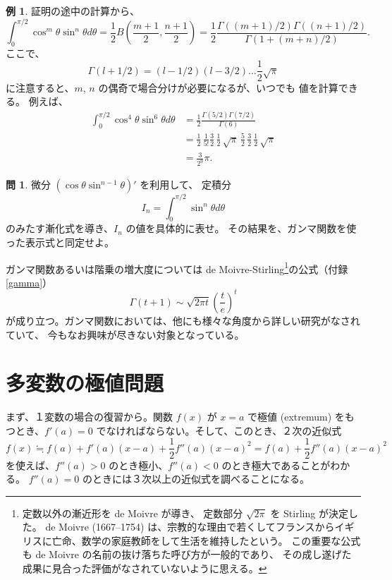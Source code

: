 \documentclass[a4paper]{jsarticle}
\theoremstyle{definition}
\newtheorem{Example}[Theorem]{例}
\newtheorem{Exercise}{問}%
\theoremstyle{remark}
\begin{document}
\begin{Example} 証明の途中の計算から、
\[
\int_0^{\pi/2} \cos^m\theta \sin^n\theta d\theta 
= \frac{1}{2} B(\frac{m+1}{2},\frac{n+1}{2}) 
= \frac{1}{2} \frac{\Gamma((m+1)/2)\Gamma((n+1)/2)}
{\Gamma(1 + (m+n)/2)}.
\]
ここで、
\[
\Gamma(l+1/2) = (l-1/2)(l-3/2)\dots \frac{1}{2} \sqrt{\pi}
\]
に注意すると、$m$, $n$ の偶奇で場合分けが必要になるが、いつでも
値を計算できる。
例えば、
\begin{align*}
\int_0^{\pi/2} \cos^4\theta \sin^6\theta d\theta 
&= \frac{1}{2} 
\frac{\Gamma(5/2)\Gamma(7/2)}{\Gamma(6)}\\
&= \frac{1}{2}\, \frac{1}{{5!}}
\frac{3}{2}\, \frac{1}{2}\, \sqrt{\pi}\, \frac{5}{2}\, 
\frac{3}{2} \, \frac{1}{2} \, \sqrt{\pi}\\
&= \frac{3}{2^9} \pi.
\end{align*} 
\end{Example}

\begin{Exercise}
微分 $(\cos \theta \sin^{n-1}\theta)'$ を利用して、
定積分
\[
I_n = \int_0^{\pi/2} \sin^n\theta d\theta
\]
のみたす漸化式を導き、$I_n$ の値を具体的に表せ。
その結果を、ガンマ関数を使った表示式と同定せよ。
\end{Exercise}


ガンマ関数あるいは階乗の増大度については de Moivre-Stirling\footnote{定数以外の漸近形を de Moivre が導き、
  定数部分 $\sqrt{2\pi}$ を Stirling が決定した。
  de Moivre (1667--1754) は、宗教的な理由で若くしてフランスからイギリスに亡命、数学の家庭教師をして生活を維持したという。
  この重要な公式も de Moivre の名前の抜け落ちた呼び方が一般的であり、
  その成し遂げた成果に見合った評価がなされていないように思える。}の公式（付録\ref{gamma}）
\[
\Gamma(t+1) \sim \sqrt{2\pi t} \left(\frac{t}{e} \right)^t 
\]
が成り立つ。ガンマ関数においては、他にも様々な角度から詳しい研究がなされていて、
今もなお興味が尽きない対象となっている。

\bigskip
\section{多変数の極値問題}
まず、１変数の場合の復習から。関数 $f(x)$ が $x=a$ で極値 (extremum)
をもつとき、$f'(a) = 0$ でなければならない。そして、このとき、２次の近似式
\[
f(x) \fallingdotseq f(a) + f'(a)(x-a) + \frac{1}{2}f''(a)(x-a)^2
= f(a) + \frac{1}{2}f''(a)(x-a)^2
\]
を使えば、$f''(a)>0$ のとき極小、$f''(a)<0$ のとき極大であることがわかる。
$f''(a) = 0$ のときには３次以上の近似式を調べることになる。
\end{document}
